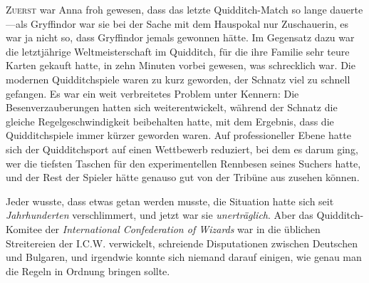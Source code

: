 
\lettrine{Z}{uerst} war Anna froh gewesen, dass das letzte Quidditch-Match so lange dauerte—als Gryffindor war sie bei der Sache mit dem Hauspokal nur Zuschauerin, es war ja nicht so, dass Gryffindor jemals gewonnen hätte. Im Gegensatz dazu war die letztjährige Weltmeisterschaft im Quidditch, für die ihre Familie sehr teure Karten gekauft hatte, in zehn Minuten vorbei gewesen, was schrecklich war. Die modernen Quidditchspiele waren zu kurz geworden, der Schnatz viel zu schnell gefangen. Es war ein weit verbreitetes Problem unter Kennern: Die Besenverzauberungen hatten sich weiterentwickelt, während der Schnatz die gleiche Regelgeschwindigkeit beibehalten hatte, mit dem Ergebnis, dass die Quidditchspiele immer kürzer geworden waren.
Auf professioneller Ebene hatte sich der Quidditchsport auf einen Wettbewerb reduziert, bei dem es darum ging, wer die tiefsten Taschen für den experimentellen Rennbesen seines Suchers hatte, und der Rest der Spieler hätte genauso gut von der Tribüne aus zusehen können.

Jeder wusste, dass etwas getan werden musste, die Situation hatte sich seit \emph{Jahrhunderten} verschlimmert, und jetzt war sie \emph{unerträglich}. Aber das Quidditch-Komitee der \emph{International Confederation of Wizards} war in die üblichen Streitereien der I.C.W. verwickelt, schreiende Disputationen zwischen Deutschen und Bulgaren, und irgendwie konnte sich niemand darauf einigen, wie genau man die Regeln in Ordnung bringen sollte.

